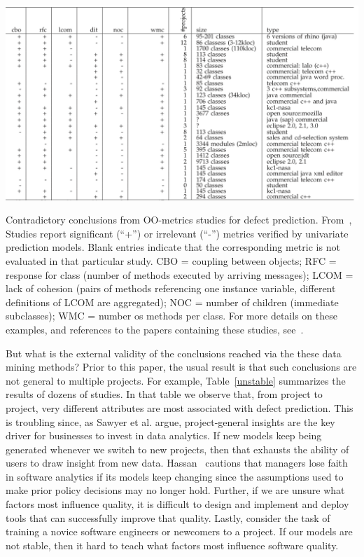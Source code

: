 \documentclass[10pt,journal,compsoc]{IEEEtran}
\begin{document}
\begin{table}
\begin{center}
\includegraphics[width=14cm]{figs/istable.png}
\end{center}
\caption{Contradictory conclusions from OO-metrics studies for defect prediction. From~\cite{menzies2012local}, Studies report significant (``+'') or irrelevant (``-'') metrics verified by univariate prediction models. Blank entries indicate that the corresponding metric is not evaluated in that particular study.   CBO = coupling between objects; RFC = response for class (number of methods executed by arriving messages); LCOM = lack of cohesion (pairs of methods referencing one instance variable, different definitions of LCOM are aggregated); NOC = number of children (immediate subclasses); WMC = number os methods per class. For more details on these examples, and references to the papers containing these studies, see~\cite{menzies2012local}.}
\label{unstable}
\end{table}

{\color{blue} But what is the external validity of the conclusions reached  via
the these data mining methods? Prior to this paper, the usual result is that such conclusions are not general to multiple projects. For example, Table~\ref{unstable} summarizes the results of dozens of studies. In that table we observe that, from project to project, very different attributes are most associated with defect prediction. This is troubling since,   as
Sawyer et al. argue,   project-general
insights are the key driver for businesses to invest in data analytics.
If  new models keep being generated whenever we switch to  new projects, then that exhausts the ability of  users to draw insight from  new data.
Hassan~\cite{Hassan17} cautions that managers lose faith in software analytics if its models keep changing since  the assumptions used to make prior policy decisions may no longer hold. 
 Further,
if we are unsure what factors most influence quality, it is difficult to design and implement and deploy tools that can successfully improve that quality.
Lastly,
consider the task of training a   novice software engineers or newcomers to a project. If our models are not stable, then it hard to teach what factors  most influence software quality.}
\end{document}
